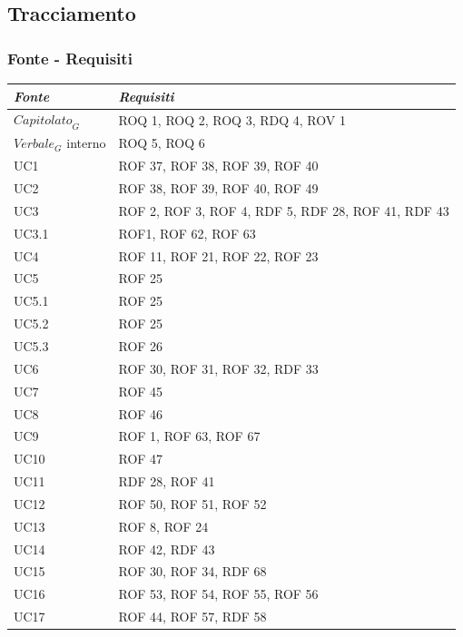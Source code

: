 \documentclass[12pt, oneside]{article}
\begin{document}
\setlength{\extrarowheight}{8pt}
\subsection{Tracciamento}
\subsubsection{Fonte - Requisiti}
\begin{longtable}{|p{4cm}|p{12cm}|}
    \hline
    \emph{Fonte} & \emph{Requisiti}\\
    \hline
    \endfirsthead
    \endhead
    $\textit{Capitolato}_G$ & ROQ 1, ROQ 2, ROQ 3, RDQ 4, ROV 1 \\
    \hline
    $\textit{Verbale}_G$ interno & ROQ 5, ROQ 6 \\
    \hline
    UC1 & ROF 37, ROF 38, ROF 39, ROF 40 \\
    \hline
    UC2 & ROF 38, ROF 39, ROF 40, ROF 49  \\
    \hline
    UC3 & ROF 2, ROF 3, ROF 4, RDF 5, RDF 28, ROF 41, RDF 43 \\
    \hline 
    UC3.1 & ROF1, ROF 62, ROF 63 \\
    \hline
    UC4 & ROF 11, ROF 21, ROF 22, ROF 23 \\
    \hline
    UC5 & ROF 25 \\
    \hline
    UC5.1 & ROF 25 \\
    \hline
    UC5.2 & ROF 25 \\
    \hline
    UC5.3 & ROF 26 \\
    \hline
    UC6 & ROF 30, ROF 31, ROF 32, RDF 33 \\
    \hline
    UC7 & ROF 45  \\
    \hline
    UC8 & ROF 46 \\
    \hline
    UC9 & ROF 1, ROF 63, ROF 67 \\
    \hline
    UC10 & ROF 47 \\
    \hline
    UC11 & RDF 28, ROF 41 \\
    \hline
    UC12 & ROF 50, ROF 51, ROF 52 \\
    \hline
    UC13 & ROF 8, ROF 24 \\
    \hline
    UC14 & ROF 42, RDF 43 \\
    \hline
    UC15 & ROF 30, ROF 34, RDF 68 \\
    \hline
    UC16 & ROF 53, ROF 54, ROF 55, ROF 56 \\
    \hline
    UC17 & ROF 44, ROF 57, RDF 58 \\

\end{longtable}
\end{document}
